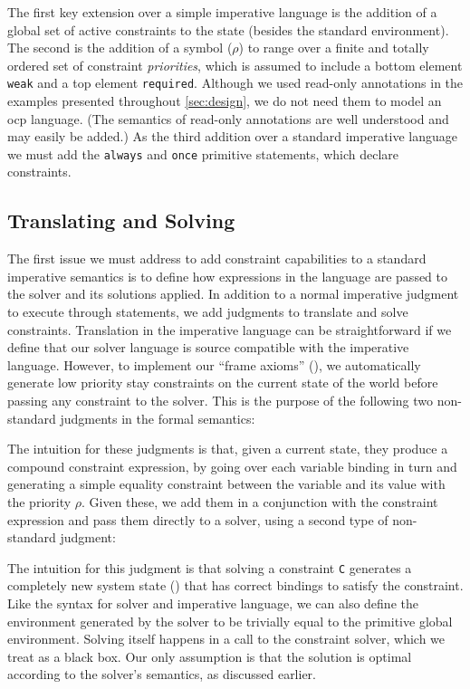 The first key extension over a simple imperative language is the addition of a
global set of active constraints to the state (besides the standard
environment). The second is the addition of a symbol ($\rho$) to range over a
finite and totally ordered set of constraint {\em priorities}, which is assumed
to include a bottom element \texttt{weak} and a top element
\texttt{required}. Although we used read-only annotations in the examples
presented throughout \autoref{sec:design}, we do not need them to model an
\ac{ocp} language. (The semantics of read-only annotations are well understood
and may easily be added.) As the third addition over a standard imperative
language we must add the \texttt{always} and \texttt{once} primitive statements,
which declare constraints.

\subsection{Translating and Solving}

The first issue we must address to add constraint capabilities to a standard
imperative semantics is to define how expressions in the language are passed to
the solver and its solutions applied. In addition to a normal imperative
judgment to execute through statements, we add judgments to translate and solve
constraints. Translation in the imperative language can be straightforward if we
define that our solver language is source compatible with the imperative
language. However, to implement our ``frame axioms''
(), we automatically generate low priority stay
constraints on the current state of the world before passing any constraint to
the solver. This is the purpose of the following two non-standard judgments in
the formal semantics:


The intuition for these judgments is that, given a current state, they produce a
compound constraint expression, by going over each variable binding in turn and
generating a simple equality constraint between the variable and its value with
the priority $\rho$. Given these, we add them in a conjunction with the
constraint expression and pass them directly to a solver, using a second type of
non-standard judgment:


The intuition for this judgment is that solving a constraint \texttt{C}
generates a completely new system state (\texttt{\Scope}) that has correct
bindings to satisfy the constraint. Like the syntax for solver and imperative
language, we can also define the environment generated by the solver to be
trivially equal to the primitive global environment. Solving itself happens in a
call to the constraint solver, which we treat as a black box. Our only
assumption is that the solution is optimal according to the solver's semantics,
as discussed earlier.

